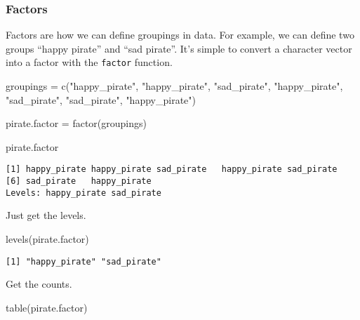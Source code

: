\documentclass[
  letterpaper,
  DIV=11,
  numbers=noendperiod]{scrartcl}
\newenvironment{Shaded}{\begin{snugshade}}{\end{snugshade}}
\newcommand{\FunctionTok}[1]{\textcolor[rgb]{0.28,0.35,0.67}{#1}}
\newcommand{\NormalTok}[1]{\textcolor[rgb]{0.00,0.23,0.31}{#1}}
\newcommand{\OtherTok}[1]{\textcolor[rgb]{0.00,0.23,0.31}{#1}}
\newcommand{\StringTok}[1]{\textcolor[rgb]{0.13,0.47,0.30}{#1}}
\begin{document}
\subsubsection{Factors}\label{factors}

Factors are how we can define groupings in data. For example, we can
define two groups ``happy pirate'' and ``sad pirate''. It's simple to
convert a character vector into a factor with the \texttt{factor}
function.

\begin{Shaded}
\begin{Highlighting}[]
\NormalTok{groupings }\OtherTok{=} \FunctionTok{c}\NormalTok{(}\StringTok{"happy\_pirate"}\NormalTok{,}
              \StringTok{"happy\_pirate"}\NormalTok{,}
              \StringTok{"sad\_pirate"}\NormalTok{,}
              \StringTok{"happy\_pirate"}\NormalTok{,}
              \StringTok{"sad\_pirate"}\NormalTok{,}
              \StringTok{"sad\_pirate"}\NormalTok{,}
              \StringTok{"happy\_pirate"}\NormalTok{)}

\NormalTok{pirate.factor }\OtherTok{=} \FunctionTok{factor}\NormalTok{(groupings)}

\NormalTok{pirate.factor}
\end{Highlighting}
\end{Shaded}

\begin{verbatim}
[1] happy_pirate happy_pirate sad_pirate   happy_pirate sad_pirate  
[6] sad_pirate   happy_pirate
Levels: happy_pirate sad_pirate
\end{verbatim}

Just get the levels.

\begin{Shaded}
\begin{Highlighting}[]
\FunctionTok{levels}\NormalTok{(pirate.factor)}
\end{Highlighting}
\end{Shaded}

\begin{verbatim}
[1] "happy_pirate" "sad_pirate"  
\end{verbatim}

Get the counts.

\begin{Shaded}
\begin{Highlighting}[]
\FunctionTok{table}\NormalTok{(pirate.factor)}
\end{Highlighting}
\end{Shaded}
\end{document}
